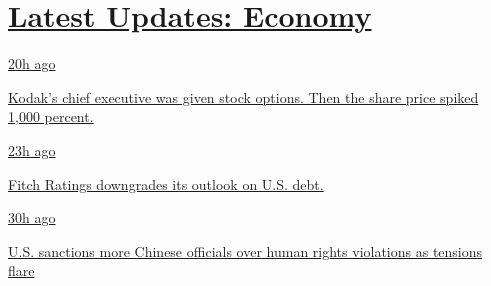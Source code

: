 \hypertarget{latest-updates-economy}{%
\section{\texorpdfstring{\href{https://www.nytimes3xbfgragh.onion/live/2020/07/31/business/stock-market-today-coronavirus?action=click\&pgtype=Article\&state=default\&region=MAIN_CONTENT_1\&context=storylines_live_updates}{Latest
Updates:
Economy}}{Latest Updates: Economy}}\label{latest-updates-economy}}

\href{https://www.nytimes3xbfgragh.onion/live/2020/07/31/business/stock-market-today-coronavirus?action=click\&pgtype=Article\&state=default\&region=MAIN_CONTENT_1\&context=storylines_live_updates\#kodaks-chief-executive-was-given-stock-options-then-the-share-price-spiked-1000-percent}{20h
ago}

\href{https://www.nytimes3xbfgragh.onion/live/2020/07/31/business/stock-market-today-coronavirus?action=click\&pgtype=Article\&state=default\&region=MAIN_CONTENT_1\&context=storylines_live_updates\#kodaks-chief-executive-was-given-stock-options-then-the-share-price-spiked-1000-percent}{Kodak's
chief executive was given stock options. Then the share price spiked
1,000 percent.}

\href{https://www.nytimes3xbfgragh.onion/live/2020/07/31/business/stock-market-today-coronavirus?action=click\&pgtype=Article\&state=default\&region=MAIN_CONTENT_1\&context=storylines_live_updates\#fitch-ratings-downgrades-its-outlook-on-us-debt}{23h
ago}

\href{https://www.nytimes3xbfgragh.onion/live/2020/07/31/business/stock-market-today-coronavirus?action=click\&pgtype=Article\&state=default\&region=MAIN_CONTENT_1\&context=storylines_live_updates\#fitch-ratings-downgrades-its-outlook-on-us-debt}{Fitch
Ratings downgrades its outlook on U.S. debt.}

\href{https://www.nytimes3xbfgragh.onion/live/2020/07/31/business/stock-market-today-coronavirus?action=click\&pgtype=Article\&state=default\&region=MAIN_CONTENT_1\&context=storylines_live_updates\#us-sanctions-more-chinese-officials-over-human-rights-violations-as-tensions-flare}{30h
ago}

\href{https://www.nytimes3xbfgragh.onion/live/2020/07/31/business/stock-market-today-coronavirus?action=click\&pgtype=Article\&state=default\&region=MAIN_CONTENT_1\&context=storylines_live_updates\#us-sanctions-more-chinese-officials-over-human-rights-violations-as-tensions-flare}{U.S.
sanctions more Chinese officials over human rights violations as
tensions flare}


